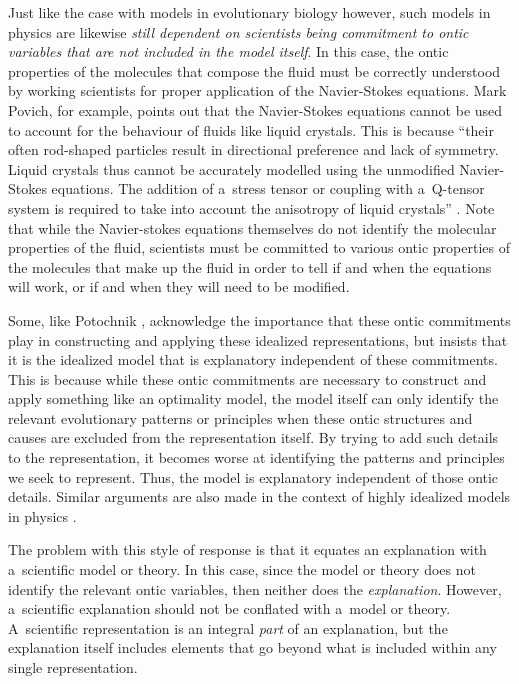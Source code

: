 Just like the case with models in evolutionary biology however, such models in physics are likewise \textit{still dependent on scientists being commitment to ontic variables that are not included in the model itself}. In this case, the ontic properties of the molecules that compose the fluid must be correctly understood by working scientists for proper application of the Navier-Stokes equations. Mark Povich, for example, points out that the Navier-Stokes equations cannot be used to account for the behaviour of fluids like liquid crystals. This is because ``their often rod-shaped particles result in directional preference and lack of symmetry. Liquid crystals thus cannot be accurately modelled using the unmodified Navier-Stokes equations. The addition of a~stress tensor or coupling with a~Q-tensor system is required to take into account the anisotropy of liquid crystals''
\parencite[][p.124]{povich_because_2018}. %
 Note that while the Navier-stokes equations themselves do not identify the molecular properties of the fluid, scientists must be committed to various ontic properties of the molecules that make up the fluid in order to tell if and when the equations will work, or if and when they will need to be modified.

Some, like Potochnik
\parencite*[][]{potochnik_explanatory_2010}, %
 acknowledge the importance that these ontic commitments play in constructing and applying these idealized representations, but insists that it is the idealized model that is explanatory independent of these commitments. This is because while these ontic commitments are necessary to construct and apply something like an optimality model, the model itself can only identify the relevant evolutionary patterns or principles when these ontic structures and causes are excluded from the representation itself. By trying to add such details to the representation, it becomes worse at identifying the patterns and principles we seek to represent. Thus, the model is explanatory independent of those ontic details. Similar arguments are also made in the context of highly idealized models in physics 
\parencites[see][]{batterman_devil_2002}[][]{batterman_minimal_2014}.%


The problem with this style of response is that it equates an explanation with a~scientific model or theory. In this case, since the model or theory does not identify the relevant ontic variables, then neither does the \textit{explanation}. However, a~scientific explanation should not be conflated with a~model or theory. A~scientific representation is an integral \textit{part} of an explanation, but the explanation itself includes elements that go beyond what is included within any single representation.

